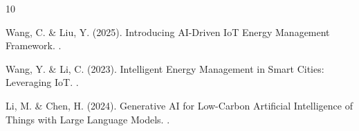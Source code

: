 \documentclass[12pt,a4paper]{article}
\begin{document}

\begin{thebibliography}{10}

Wang, C. \& Liu, Y. (2025).
\newblock Introducing AI-Driven IoT Energy Management Framework.
.

Wang, Y. \& Li, C. (2023).
\newblock Intelligent Energy Management in Smart Cities: Leveraging IoT.
.

Li, M. \& Chen, H. (2024).
\newblock Generative AI for Low-Carbon Artificial Intelligence of Things with Large Language Models.
.

\end{thebibliography}
\end{document}
